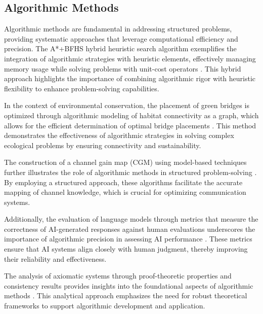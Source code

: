 


\subsection{Algorithmic Methods} \label{subsec:Algorithmic Methods}



Algorithmic methods are fundamental in addressing structured problems, providing systematic approaches that leverage computational efficiency and precision. The A*+BFHS hybrid heuristic search algorithm exemplifies the integration of algorithmic strategies with heuristic elements, effectively managing memory usage while solving problems with unit-cost operators \cite{bu2021abfhshybridheuristicsearch}. This hybrid approach highlights the importance of combining algorithmic rigor with heuristic flexibility to enhance problem-solving capabilities.

In the context of environmental conservation, the placement of green bridges is optimized through algorithmic modeling of habitat connectivity as a graph, which allows for the efficient determination of optimal bridge placements \cite{fluschnik2024placinggreenbridgesoptimally}. This method demonstrates the effectiveness of algorithmic strategies in solving complex ecological problems by ensuring connectivity and sustainability.

The construction of a channel gain map (CGM) using model-based techniques further illustrates the role of algorithmic methods in structured problem-solving \cite{xu2023dataneededchannelknowledge}. By employing a structured approach, these algorithms facilitate the accurate mapping of channel knowledge, which is crucial for optimizing communication systems.

Additionally, the evaluation of language models through metrics that measure the correctness of AI-generated responses against human evaluations underscores the importance of algorithmic precision in assessing AI performance \cite{oh2024generativeaiparadoxevaluation}. These metrics ensure that AI systems align closely with human judgment, thereby improving their reliability and effectiveness.

The analysis of axiomatic systems through proof-theoretic properties and consistency results provides insights into the foundational aspects of algorithmic methods \cite{cieslinski2022axiomstypefreesubjectiveprobability}. This analytical approach emphasizes the need for robust theoretical frameworks to support algorithmic development and application.


